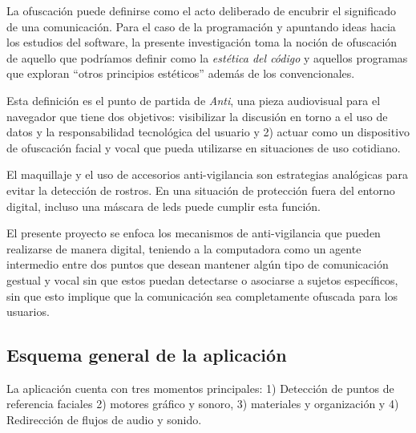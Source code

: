 
La ofuscación puede definirse como el acto deliberado de encubrir el significado de una comunicación. Para el caso de la programación y apuntando ideas hacia los estudios del software, la presente investigación toma la noción de ofuscación de aquello que podríamos definir como la \emph{estética del código}\citep{EWD:EWD35} y aquellos programas que exploran ``otros principios estéticos''\citep{obfuscatedCode} además de los convencionales. 



Esta definición es el punto de partida de \emph{Anti}, una pieza audiovisual para el navegador que tiene dos objetivos: visibilizar la discusión en torno a el uso de datos y la responsabilidad tecnológica del usuario y 2) actuar como un dispositivo de ofuscación facial y vocal que pueda utilizarse en situaciones de uso cotidiano. 

El maquillaje y el uso de accesorios anti-vigilancia son estrategias analógicas para evitar la detección de rostros. En una situación de protección fuera del entorno digital, incluso una máscara de leds puede cumplir esta función.

El presente proyecto se enfoca los mecanismos de anti-vigilancia que pueden realizarse de manera digital, teniendo a la computadora como un agente intermedio entre dos puntos que desean mantener algún tipo de comunicación gestual y vocal sin que estos puedan detectarse o asociarse a sujetos específicos, sin que esto implique que la comunicación sea completamente ofuscada para los usuarios.

\subsection{Esquema general de la aplicación}

La aplicación cuenta con tres momentos principales: 1) Detección de puntos de referencia faciales 2) motores gráfico y sonoro, 3) materiales y organización y 4) Redirección de flujos de audio y sonido.


